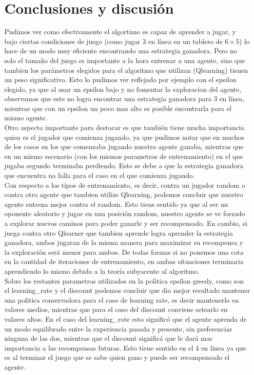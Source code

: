 \newpage
\section{Conclusiones y discusión}

Pudimos ver como efectivamente el algortimo es capaz de aprender a jugar, y bajo ciertas condiciones de juego (como jugar 3 en línea en un tablero de $6\times5$) lo hace de un modo muy eficiente encontrando una estrategia ganadora.
Pero no solo el tamaño del juego es importante a la hora entrenar a una agente, sino que tambien los parámetros elegidos para el algoritmo que utilizan (Qlearning) tienen un peso significativo. Esto lo pudimos ver reflejado por ejemplo con el epsilon elegido, ya que al usar un epsilon bajo y no fomentar la exploracion del agente, observamos que este no logra encontrar una estrategia ganadora para 3 en línea, mientras que con un epsilon un poco mas alto es posible encontrarla para el mismo agente. \\

Otro aspecto importante para destacar es que también tiene mucha importancia quien es el jugador que comienza jugando, ya que pudimos notar que en muchos de los casos en los que comenzaba jugando nuestro agente ganaba, mientras que en un mismo escenario (con los mismos parametros de entrenamiento) en el que jugaba segundo terminaba perdiendo. Esto se debe a que la estrategia ganadora que encuentra no falla para el caso en el que comienza jugando. \\

Con respecto a los tipos de entrenamiento, es decir, contra un jugador random o contra otro agente que tambien utilize Qlearning, podemos concluir que nuestro agente entrena mejor contra el random. Esto tiene sentido ya que al ser un oponente aleatorio y jugar en una posición random, nuestro agente se ve forzado a explorar nuevos caminos para poder ganarle y ser recompensado. En cambio, si juega contra otro Qlearner que tambien aprende logra aprender la estrategia ganadora, ambos jugaran de la misma manera para maximizar su recompensa y la exploración será menor para ambos. De todas formas si no ponemos una cota en la cantidad de iteraciones de entrenamiento, en ambas situaciones terminaria aprendiendo lo mismo debido a la teoría subyacente al algoritmo. \\

Sobre los restantes parametros utilizados en la politica epsilon greedy, como son el learning\_rate y el discount podemos concluir que dio mejor resultado mantener una politica conservadora para el caso de learning rate, es decir mantenerlo en valores medios, mientras que para el caso del discount conviene setearlo en valores altos. En el caso del learning\_rate esto significó que el agente aprenda de un modo equilibrado entre la experiencia pasada y presente, sin preferenciar ninguna de las dos, mientras que el discount significá que le dará mas importancia a las recompensas futuras. Esto tiene sentido en el 4 en línea ya que es al terminar el juego que se sabe quien gano y puede ser recompensado el agente.
